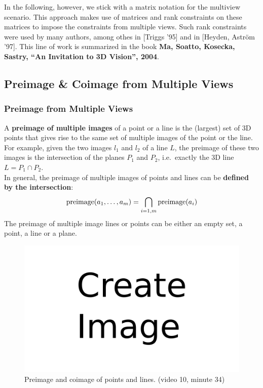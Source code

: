 In the following, however, we stick with a matrix notation for the multiview scenario.
This approach makes use of matrices and rank constraints on these matrices
to impose the constraints from multiple views.
Such rank constraints were used by many authors, among othes in [Triggs '95]
and in [Heyden, Astr\"om '97].
This line of work is summarized in the book
\textbf{Ma, Soatto, Kosecka, Sastry, ``An Invitation to 3D Vision'', 2004}.


\subsection{Preimage \& Coimage from Multiple Views}%
\label{sub:preimage_coimage_from_multiple_views}


\subsubsection*{Preimage from Multiple Views}%
\label{ssub:preimage_from_multiple_views}


A \textbf{preimage of multiple images} of a point or a line is the
(largest) set of 3D points that gives rise to the same set of
multiple images of the point or the line.\\

For example, given the two images $l_1$ and $l_2$ of a line $L$,
the preimage of these two images is the intersection of the planes
$P_1$ and $P_2$, i.e.\ exactly the 3D line $L = P_1 \cap P_2$.\\

In general, the preimage of multiple images of points and lines
can be \textbf{defined by the intersection}:
\[
	\text{preimage} (a_1, \ldots, a_m) = \bigcap_{i = 1, m} \text{preimage} (a_i)
\]
The preimage of multiple image lines or points can be either
an empty set, a point, a line or a plane.

\begin{figure}[h]
	\centering
	\includegraphics[width=\linewidth]{img/todo.png}
	\caption{Preimage and coimage of points and lines. (video 10, minute 34)}%
	\label{fig:preimage_coimage}
\end{figure}

